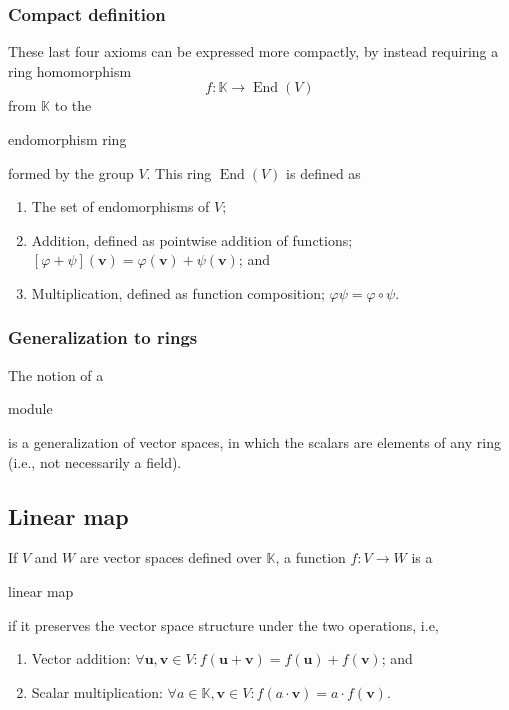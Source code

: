\documentclass{article}
\DeclareMathOperator{\End}{End}
\newenvironment{enumerated}{ 
\begin{enumerate}
\setlength{\itemsep}{0pt}
\setlength{\parskip}{0pt}
\setlength{\parsep}{0pt}     
}{\end{enumerate}}
\renewcommand{\vec}[1]{\mathbf{#1}}
\begin{document}
\subsubsection*{Compact definition}
These last four axioms can be expressed more compactly, by instead requiring a ring homomorphism
$$ f : \mathbb{K} \rightarrow \End(V) $$
from $\mathbb{K}$ to the \begin{em}endomorphism ring\end{em} formed by the group $V.$ This ring $\End(V)$ is defined as
\begin{enumerated}
  \item The set of endomorphisms of $V$;
  \item Addition, defined as pointwise addition of functions; $ \left[\varphi + \psi\right](\vec{v}) = \varphi(\vec{v}) + \psi(\vec{v}) $; and
  \item Multiplication, defined as function composition; $ \varphi\psi = \varphi \circ \psi. $
\end{enumerated}

\subsubsection*{Generalization to rings}

The notion of a \begin{em}module\end{em} is a generalization of vector spaces, in which the scalars are elements of any ring (i.e., not necessarily a field).

\subsection*{Linear map}

If $V$ and $W$ are vector spaces defined over $\mathbb{K}$, a function $f : V \rightarrow W$ is a \begin{em}linear map\end{em} if it preserves the vector space structure under the two operations, i.e,

  \begin{enumerated}
    \item Vector addition: $ \forall \vec{u}, \vec{v} \in V : f(\vec{u} + \vec{v}) = f(\vec{u}) + f(\vec{v}) $; and
    \item Scalar multiplication: $ \forall a \in \mathbb{K}, \vec{v} \in V : f(a \cdot \vec{v}) = a \cdot f(\vec{v}). $
  \end{enumerated}
\end{document}
